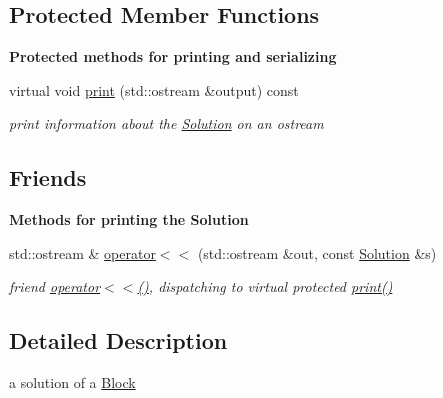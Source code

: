 \subsection*{Protected Member Functions}
\begin{Indent}\textbf{ Protected methods for printing and serializing}\par
\begin{DoxyCompactItemize}
\item 
virtual void \mbox{\hyperlink{class_s_m_spp__di__unipi__it_1_1_solution_a2e7b9c9148a98c5c342e8c25cac95926}{print}} (std\+::ostream \&output) const
\begin{DoxyCompactList}\small\item\em print information about the \mbox{\hyperlink{class_s_m_spp__di__unipi__it_1_1_solution}{Solution}} on an ostream \end{DoxyCompactList}\end{DoxyCompactItemize}
\end{Indent}
\subsection*{Friends}
\begin{Indent}\textbf{ Methods for printing the Solution}\par
\begin{DoxyCompactItemize}
\item 
std\+::ostream \& \mbox{\hyperlink{class_s_m_spp__di__unipi__it_1_1_solution_a1963158e39c1643e92996ee932626aab}{operator$<$$<$}} (std\+::ostream \&out, const \mbox{\hyperlink{class_s_m_spp__di__unipi__it_1_1_solution}{Solution}} \&s)
\begin{DoxyCompactList}\small\item\em friend \mbox{\hyperlink{class_s_m_spp__di__unipi__it_1_1_solution_a1963158e39c1643e92996ee932626aab}{operator$<$$<$()}}, dispatching to virtual protected \mbox{\hyperlink{class_s_m_spp__di__unipi__it_1_1_solution_a2e7b9c9148a98c5c342e8c25cac95926}{print()}} \end{DoxyCompactList}\end{DoxyCompactItemize}
\end{Indent}


\subsection{Detailed Description}
a solution of a \mbox{\hyperlink{class_s_m_spp__di__unipi__it_1_1_block}{Block}} 

